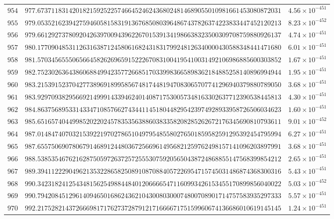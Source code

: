 \documentclass[12pt,reqno]{amsart}
\theoremstyle{remark}
\begin{document}
\begin{longtable}{clc}
$954$ & $977.6737118314201821592522574664524624368024814689055010981661453080872031$ & $4.56\times 10^{-451}$ \\
$955$ & $979.0535216239427594605815831913676850803964867437826374223833447452120213$ & $8.23\times 10^{-452}$ \\
$956$ & $979.6612927378092042639700943962267015391341986638323500309708759880926137$ & $4.74\times 10^{-451}$ \\
$957$ & $980.1770904853112631638712458061682431831799248126340000430588348441471680$ & $6.01\times 10^{-451}$ \\
$958$ & $981.5703456555065664582626965915222670831004195410031492106986885600303852$ & $1.67\times 10^{-451}$ \\
$959$ & $982.7523026364386068849942357726685170339983665898362184885258140896994944$ & $1.95\times 10^{-451}$ \\
$960$ & $983.2153915237042773896918995856748174481947083065707741296940379880789050$ & $3.68\times 10^{-451}$ \\
$961$ & $983.9297093829566921499914339462401408717530057348163302637712390538445813$ & $4.30\times 10^{-451}$ \\
$962$ & $984.8637568953314334710857662743441145180448295423974928933958726506034623$ & $1.60\times 10^{-451}$ \\
$963$ & $985.6516574044998520220245783535638860383358208285262672176345690810793611$ & $9.01\times 10^{-452}$ \\
$964$ & $987.0148474070321539221970278651049795485580276501859582591295392454795994$ & $6.27\times 10^{-451}$ \\
$965$ & $987.6557506907806791468912448036725669614956821259762498157141096203897991$ & $3.68\times 10^{-451}$ \\
$966$ & $988.5385354676216287505972637257255530759205650438724868855147568399854212$ & $2.65\times 10^{-451}$ \\
$967$ & $989.3941122290496213532286582508910870884057226954715745031486874368300316$ & $5.43\times 10^{-451}$ \\
$968$ & $990.3423182412543481562549884484012066665471160993426153455170899856040022$ & $5.03\times 10^{-452}$ \\
$969$ & $990.7942084512961409465016862436210430080300074800708901714757583935297333$ & $5.57\times 10^{-451}$ \\
$970$ & $992.2175282143726669817176273728791217166667175159960674136686010619145145$ & $1.24\times 10^{-451}$ \\

\end{longtable}
\end{document}
